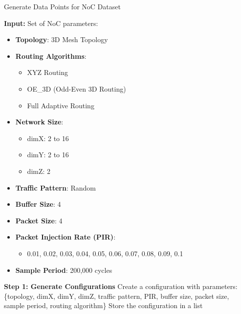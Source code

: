 \documentclass[conference]{IEEEtran}
\begin{document}
\begin{algorithm}[h]
\caption{Generate Data Points for NoC Dataset}
\label{algo}
\begin{algorithmic}[1]
    \State \textbf{Input:} Set of NoC parameters:
        \begin{itemize}
            \item \textbf{Topology}: 3D Mesh Topology
            \item \textbf{Routing Algorithms}: 
                \begin{itemize}
                    \item XYZ Routing
                    \item OE\_3D (Odd-Even 3D Routing)
                    \item Full Adaptive Routing
                \end{itemize}
            \item \textbf{Network Size}: 
                \begin{itemize}
                    \item dimX: 2 to 16
                    \item dimY: 2 to 16
                    \item dimZ: 2
                \end{itemize}
            \item \textbf{Traffic Pattern}: Random
            \item \textbf{Buffer Size}: 4 
            \item \textbf{Packet Size}: 4
            \item \textbf{Packet Injection Rate (PIR)}: 
                \begin{itemize}
                    \item 0.01, 0.02, 0.03, 0.04, 0.05, 0.06, 0.07, 0.08, 0.09, 0.1
                \end{itemize}
            \item \textbf{Sample Period}: 200,000 cycles
        \end{itemize}
        
    \State \textbf{Step 1: Generate Configurations}
                    \State Create a configuration with parameters: 
                        \{topology, dimX, dimY, dimZ, traffic pattern, PIR, buffer size, packet size, sample period, routing algorithm\}
                    \State Store the configuration in a list
                \EndFor
            \EndFor
        \EndFor
    \EndFor
    

\end{algorithmic}
\end{algorithm}
\end{document}
